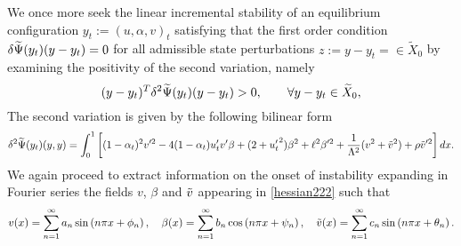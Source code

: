We once more seek the linear incremental stability of an equilibrium configuration $y_t := (u, \alpha,  v)_t$ satisfying that the first order condition $\delta \widetilde\Psi(y_t)(y-y_t)=0$ for all admissible state perturbations $z:=y-y_t=\in\widetilde X_0$ by examining the positivity of the second variation, namely
\begin{equation*}
    (y-y_t)^T\delta^2 \widetilde\Psi(y_t)(y-y_t)>0, \qquad \forall y-y_t\in \widetilde X_0,
\end{equation*}The second variation is given by the following bilinear form 
\begin{equation}
\delta^2 \widetilde\Psi(y_t)(y, y)=\int_0^1 \left[(1-\alpha_t)^2v'^2 
- 4(1-\alpha_t)u_t' v'\beta+(2+ {u_t'}^2)\beta^2+\ell^2\beta'^2 +\frac{1}{\Lambda^2}( v^2 + \tilde v^2)+\rho \tilde v'^2\right]dx.\label{hessian222}\end{equation}
We again proceed to extract information on the onset of instability expanding in Fourier series the fields $v$, $\beta$ and $\tilde v$ appearing in \eqref{hessian222} such that 
\[
v(x) = \sum_{n=1}^{\infty} a_{n} \sin \left(n \pi x + \phi_{n}\right),
\quad \beta(x) = \sum_{n=1}^{\infty} b_{n} \cos \left(n \pi x + \psi_{n}\right),
\quad \tilde v(x) = \sum_{n=1}^{\infty} c_{n} \sin \left(n \pi x + \theta_{n}\right).
\]

